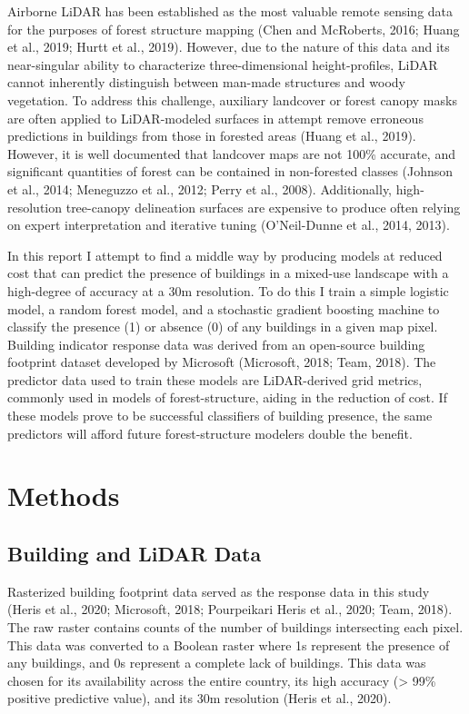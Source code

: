 \documentclass[]{elsarticle} %
\begin{document}
Airborne LiDAR has been established as the most valuable remote sensing data for
the purposes of forest structure mapping (Chen and McRoberts, 2016; Huang et al., 2019; Hurtt et al., 2019).
However, due to the nature of this data and its near-singular ability to
characterize three-dimensional height-profiles,
LiDAR cannot inherently distinguish between man-made structures and woody
vegetation.
To address this challenge, auxiliary landcover or forest canopy masks
are often applied to LiDAR-modeled surfaces in attempt remove erroneous
predictions in buildings from those in forested areas (Huang et al., 2019).
However, it is well documented that landcover maps are not 100\% accurate, and
significant quantities of forest can be contained in non-forested classes
(Johnson et al., 2014; Meneguzzo et al., 2012; Perry et al., 2008).
Additionally, high-resolution tree-canopy delineation surfaces are expensive
to produce often relying on expert interpretation and iterative tuning
(O'Neil-Dunne et al., 2014, 2013).

In this report I attempt to find a middle way by producing models at reduced
cost that can predict the presence of buildings in a mixed-use landscape with a high-degree of accuracy at a 30m resolution.
To do this I train a simple logistic model,
a random forest model, and a stochastic gradient boosting machine to classify
the presence (1) or absence (0) of any buildings in a given map pixel.
Building indicator response data was derived from an open-source building
footprint dataset developed by Microsoft (Microsoft, 2018; Team, 2018).
The predictor data used to train these models are LiDAR-derived grid metrics, commonly used in models of forest-structure, aiding in the reduction of cost.
If these models prove to be successful classifiers of building presence,
the same predictors will afford future forest-structure modelers double the
benefit.

\hypertarget{methods}{%
\section{Methods}\label{methods}}

\hypertarget{building-and-lidar-data}{%
\subsection{Building and LiDAR Data}\label{building-and-lidar-data}}

Rasterized building footprint data served as the response data in this study
(Heris et al., 2020; Microsoft, 2018; Pourpeikari Heris et al., 2020; Team, 2018).
The raw raster contains counts of the number of buildings intersecting each
pixel.
This data was converted to a Boolean raster where 1s represent the presence of
any buildings, and 0s represent a complete lack of buildings.
This data was chosen for its availability across the entire country, its high
accuracy (\textgreater{} 99\% positive predictive value), and its 30m resolution
(Heris et al., 2020).
\end{document}
